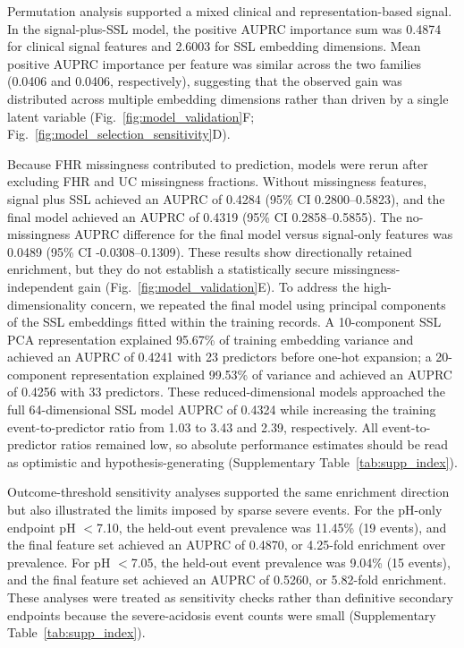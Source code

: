 \documentclass[pdflatex,sn-nature]{sn-jnl}
\begin{document}
Permutation analysis supported a mixed clinical and representation-based signal. In the signal-plus-SSL model, the positive AUPRC importance sum was 0.4874 for clinical signal features and 2.6003 for SSL embedding dimensions. Mean positive AUPRC importance per feature was similar across the two families (0.0406 and 0.0406, respectively), suggesting that the observed gain was distributed across multiple embedding dimensions rather than driven by a single latent variable (Fig.~\ref{fig:model_validation}F; Fig.~\ref{fig:model_selection_sensitivity}D).

Because FHR missingness contributed to prediction, models were rerun after excluding FHR and UC missingness fractions. Without missingness features, signal plus SSL achieved an AUPRC of 0.4284 (95\% CI 0.2800--0.5823), and the final model achieved an AUPRC of 0.4319 (95\% CI 0.2858--0.5855). The no-missingness AUPRC difference for the final model versus signal-only features was 0.0489 (95\% CI -0.0308--0.1309). These results show directionally retained enrichment, but they do not establish a statistically secure missingness-independent gain (Fig.~\ref{fig:model_validation}E). To address the high-dimensionality concern, we repeated the final model using principal components of the SSL embeddings fitted within the training records. A 10-component SSL PCA representation explained 95.67\% of training embedding variance and achieved an AUPRC of 0.4241 with 23 predictors before one-hot expansion; a 20-component representation explained 99.53\% of variance and achieved an AUPRC of 0.4256 with 33 predictors. These reduced-dimensional models approached the full 64-dimensional SSL model AUPRC of 0.4324 while increasing the training event-to-predictor ratio from 1.03 to 3.43 and 2.39, respectively. All event-to-predictor ratios remained low, so absolute performance estimates should be read as optimistic and hypothesis-generating (Supplementary Table~\ref{tab:supp_index}).

Outcome-threshold sensitivity analyses supported the same enrichment direction but also illustrated the limits imposed by sparse severe events. For the pH-only endpoint pH $<$7.10, the held-out event prevalence was 11.45\% (19 events), and the final feature set achieved an AUPRC of 0.4870, or 4.25-fold enrichment over prevalence. For pH $<$7.05, the held-out event prevalence was 9.04\% (15 events), and the final feature set achieved an AUPRC of 0.5260, or 5.82-fold enrichment. These analyses were treated as sensitivity checks rather than definitive secondary endpoints because the severe-acidosis event counts were small (Supplementary Table~\ref{tab:supp_index}).
\end{document}
